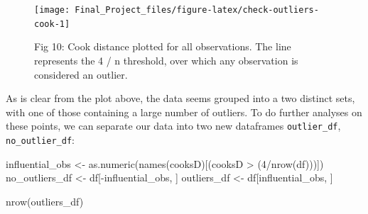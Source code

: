 \documentclass[
]{article}
\newenvironment{Shaded}{\begin{snugshade}}{\end{snugshade}}
\newcommand{\AttributeTok}[1]{\textcolor[rgb]{0.77,0.63,0.00}{#1}}
\newcommand{\DecValTok}[1]{\textcolor[rgb]{0.00,0.00,0.81}{#1}}
\newcommand{\FloatTok}[1]{\textcolor[rgb]{0.00,0.00,0.81}{#1}}
\newcommand{\FunctionTok}[1]{\textcolor[rgb]{0.00,0.00,0.00}{#1}}
\newcommand{\NormalTok}[1]{#1}
\newcommand{\OtherTok}[1]{\textcolor[rgb]{0.56,0.35,0.01}{#1}}
\newcommand{\SpecialCharTok}[1]{\textcolor[rgb]{0.00,0.00,0.00}{#1}}
\newcommand{\StringTok}[1]{\textcolor[rgb]{0.31,0.60,0.02}{#1}}
\begin{document}
\begin{Shaded}
\end{Shaded}

\begin{figure}

{\centering \texttt{[image: Final\_Project\_files/figure-latex/check-outliers-cook-1]} 

}

\caption{Fig 10: Cook distance plotted for all observations. The line represents the 4 / n threshold, over which any observation is considered an outlier.}\label{fig:check-outliers-cook}
\end{figure}

As is clear from the plot above, the data seems grouped into a two
distinct sets, with one of those containing a large number of outliers.
To do further analyses on these points, we can separate our data into
two new dataframes \texttt{outlier\_df}, \texttt{no\_outlier\_df}:

\begin{Shaded}
\begin{Highlighting}[]
\NormalTok{influential\_obs }\OtherTok{\textless{}{-}} \FunctionTok{as.numeric}\NormalTok{(}\FunctionTok{names}\NormalTok{(cooksD)[(cooksD }\SpecialCharTok{\textgreater{}}\NormalTok{ (}\DecValTok{4}\SpecialCharTok{/}\FunctionTok{nrow}\NormalTok{(df)))])}
\NormalTok{no\_outliers\_df }\OtherTok{\textless{}{-}}\NormalTok{ df[}\SpecialCharTok{{-}}\NormalTok{influential\_obs, ]}
\NormalTok{outliers\_df }\OtherTok{\textless{}{-}}\NormalTok{ df[influential\_obs, ]}

\FunctionTok{nrow}\NormalTok{(outliers\_df)}
\end{Highlighting}
\end{Shaded}
\end{document}
